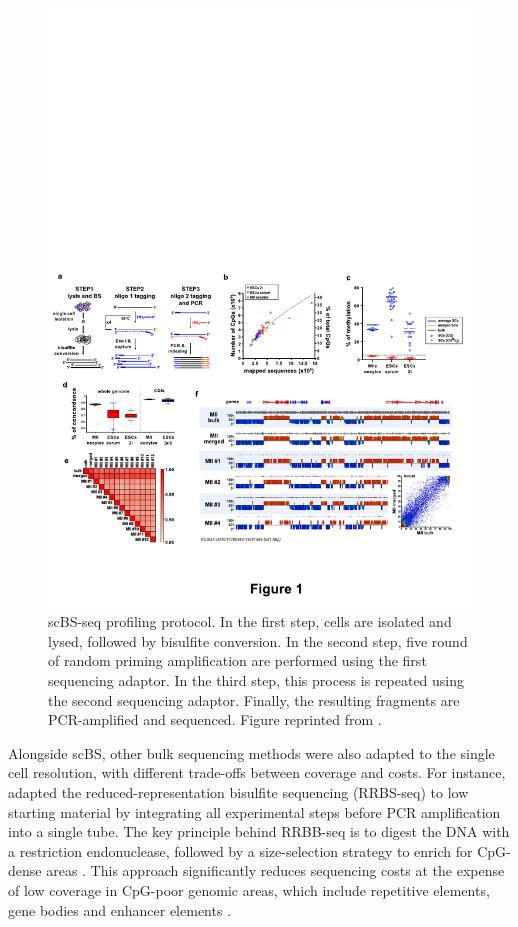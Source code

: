 \begin{figure}[H]
	\centering
	\includegraphics[width=0.8\linewidth]{scBS_protocol}
	\caption[]{scBS-seq profiling protocol. In the first step, cells are isolated and lysed, followed by bisulfite conversion. In the second step, five round of random priming amplification are performed using the first sequencing adaptor. In the third step, this process is repeated using the second sequencing adaptor. Finally, the resulting fragments are PCR-amplified and sequenced. Figure reprinted from \cite{Smallwood2014}.}
	\label{fig:scBS}
\end{figure}

Alongside scBS, other bulk sequencing methods were also adapted to the single cell resolution, with different trade-offs between coverage and costs. For instance, \cite{Guo2015} adapted the reduced-representation bisulfite sequencing (RRBS-seq) to low starting material by integrating all experimental steps before PCR amplification into a single tube. The key principle behind RRBB-seq is to digest the DNA with a restriction endonuclease, followed by a size-selection strategy to enrich for CpG-dense areas \cite{Meissner2005}. This approach significantly reduces sequencing costs at the expense of low coverage in CpG-poor genomic areas, which include repetitive elements, gene bodies and enhancer elements \cite{Martin-Herranz2017}.\\

